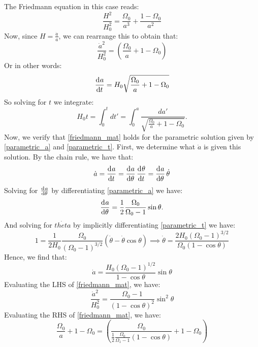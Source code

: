 The Friedmann equation in this case reads:
\begin{equation}
    \boxed{\frac{H^2}{H_0^2} = \frac{\Omega_0}{a^3} + \frac{1 - \Omega_0}{a^2}}
\end{equation}
Now, since $H = \frac{\dot{a}}{a}$, we can rearrange this to obtain that:
\begin{equation}\label{friedmann_mat}
    \frac{\dot{a}^2}{H_0^2} = (\frac{\Omega_0}{a} + 1 - \Omega_0)
\end{equation}
Or in other words:
\begin{equation}
    \dod{a}{t} = H_0\sqrt{\frac{\Omega_0}{a} + 1 - \Omega_0}
\end{equation}
So solving for $t$ we integrate:
\begin{equation}
    \boxed{H_0t = \int_0^t dt' = \int_0^a \frac{da'}{\sqrt{\frac{\Omega_0}{a} + 1 - \Omega_0}}}.
\end{equation}
Now, we verify that \eqref{friedmann_mat} holds for the parametric solution given by \eqref{parametric_a} and \eqref{parametric_t}. First, we determine what $\dot{a}$ is given this solution. By the chain rule, we have that:
\begin{equation}
    \dot{a} = \dod{a}{t} = \dod{a}{\theta}\dod{\theta}{t} = \dod{a}{\theta}\dot{\theta}
\end{equation}
Solving for $\od{a}{\theta}$ by differentiating \eqref{parametric_a} we have:
\begin{equation}
    \dod{a}{\theta} = \frac{1}{2}\frac{\Omega_0}{\Omega_0 - 1}\sin\theta.
\end{equation}
And solving for $\dot{theta}$ by implicitly differentiating \eqref{parametric_t} we have:
\begin{equation}
    1 = \frac{1}{2H_0}\frac{\Omega_0}{(\Omega_0 - 1)^{3/2}}(\dot{\theta} - \dot{\theta}\cos\theta) \implies \dot{\theta} = \frac{2H_0(\Omega_0 - 1)^{3/2}}{\Omega_0(1-\cos\theta)}
\end{equation}
Hence, we find that:
\begin{equation}
    \dot{a} = \frac{H_0(\Omega_0 - 1)^{1/2}}{1 - \cos\theta}\sin\theta
\end{equation}
Evaluating the LHS of \eqref{friedmann_mat}, we have:
\begin{equation}\label{LHS_friedmann_mat}
    \frac{\dot{a}^2}{H_0^2} = \frac{\Omega_0 - 1}{(1 - \cos\theta)^2}\sin^2\theta
\end{equation}
Evaluating the RHS of \eqref{friedmann_mat}, we have:
\begin{equation}
    \frac{\Omega_0}{a} + 1 - \Omega_0 = (\frac{\Omega_0}{\frac{1}{2}\frac{\Omega_0}{\Omega_1 - 1}(1-\cos\theta)} + 1 - \Omega_0)
\end{equation}
